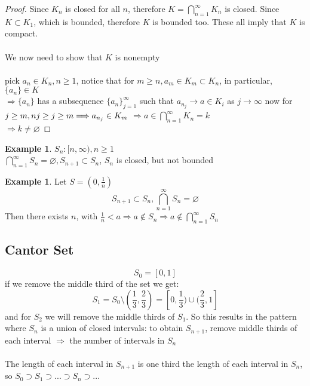 \documentclass[12pt]{article}
\theoremstyle{plain}
\theoremstyle{definition}
\newtheorem{example}[theorem]{Example}
\begin{document}
\begin{proof}
	Since $K_n$ is closed for all $n$, therefore $K = \bigcap^\infty_{n=1} K_n$ is closed. Since $K \subset K_1$, which is bounded, therefore $K$ is bounded too. These all imply that $K$ is compact.\\
	\\
	We now need to show that $K$ is nonempty\\
	\\
	pick $a_n \in K_n, n \geq 1$, notice that for $m \geq n, a_m \in K_m \subset K_n$, in particular, $\{ a_n \} \in K$\\
	$\Longrightarrow \{ a_n \} $ has a subsequence $\{ a_n \}^\infty_{j=1} $ such that $a_{n_j} \to a \in K_i$ as $j\to\infty$ now for $j \geq m, nj \geq j \geq m\\ \Longrightarrow a_{n_j} \in K_m $
	$\Longrightarrow a \in \bigcap^\infty_{n=1} K_n = k$\\
	$\Longrightarrow  k \neq \varnothing$
\end{proof}

\begin{example}
	$S_n : [n, \infty), n\geq 1$\\
	$\bigcap^\infty_{n=1} S_n = \varnothing, S_{n+1} \subset S_n$, $S_n$ is closed, but not bounded
\end{example}

\begin{example}
	Let $S = (0, \frac{1}{n})$
	$$S_{n+1} \subset S_n, \bigcap^\infty_{n=1} S_n = \varnothing$$
	Then there exists $n$, with $\frac{1}{n} < a \Longrightarrow a \not\in S_n \Longrightarrow a \not\in \bigcap^\infty_{n=1} S_n$
\end{example}

\subsection{Cantor Set}

$$S_0 = [0,1]$$
if we remove the middle third of the set we get:
$$S_1 = S_0 \setminus (\frac{1}{3}, \frac{2}{3}) = [0,\frac{1}{3}) \cup (\frac{2}{3}, 1]$$ 
and for $S_2$ we will remove the middle thirds of $S_1$. So this results in the pattern where $S_n$ is a union of closed intervals: to obtain $S_{n+1}$, remove middle thirds of each interval $\Longrightarrow$ the number of intervals in $S_n$\\
\\
The length of each interval in $S_{n+1} $ is one third the length of each interval in $S_n$, so
$S_0 \supset S_1\supset ... \supset S_n \supset...$
\end{document}
